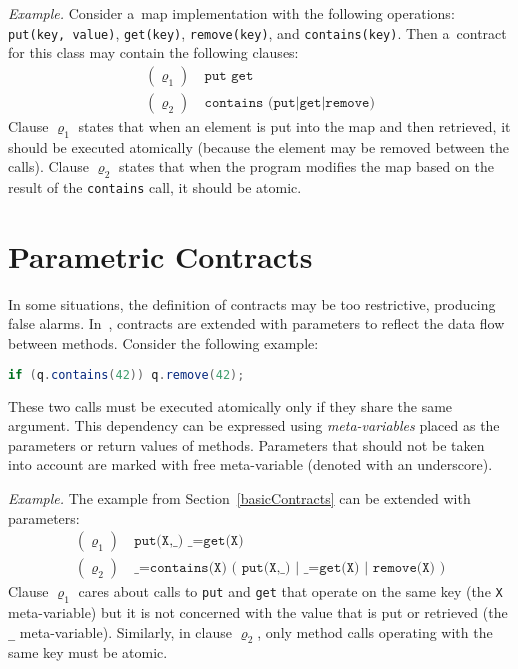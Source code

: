 \medskip \noindent
\emph{Example.} Consider a~map implementation with the following operations:
\texttt{put(key, value)}, \texttt{get(key)}, \texttt{remove(key)}, and
\texttt{contains(key)}. Then a~contract for this class may contain the following
clauses:
\begin{align*}
    (\varrho_1) &\ \texttt{put get}\\
    (\varrho_2) &\ \texttt{contains (put|get|remove)}
\end{align*}
Clause $\varrho_1$ states that when an element is put into the map and then
retrieved, it should be executed atomically (because the element may be removed
between the calls). Clause $\varrho_2$ states that when the program modifies the
map based on the result of the \texttt{contains} call, it should be atomic.

\section{Parametric Contracts}
\label{parametricContracts}

In some situations, the definition of contracts may be too restrictive,
producing false alarms. In~\cite{contracts}, contracts are extended with
parameters to reflect the data flow between methods. Consider the following
example:
\begin{lstlisting}[language=java, frame=none]
if (q.contains(42)) q.remove(42);
\end{lstlisting}
These two calls must be executed atomically only if they share the same
argument. This dependency can be expressed using \emph{meta-variables} placed as
the parameters or return values of methods. Parameters that should not be taken
into account are marked with free meta-variable (denoted with an underscore).

\medskip \noindent \emph{Example.} The example from Section~\ref{basicContracts}
can be extended with parameters:
\begin{align*}
    (\varrho_1) &\ \texttt{put(X,\_) \_=get(X)}\\
    (\varrho_2) &\ \texttt{\_=contains(X) ( put(X,\_) | \_=get(X) |
    remove(X) )}
\end{align*}
Clause $\varrho_1$ cares about calls to \texttt{put} and \texttt{get} that
operate on the same key (the \texttt{X} meta-variable) but it is not concerned
with the value that is put or retrieved (the \texttt{\_} meta-variable).
Similarly, in clause $\varrho_2$, only method calls operating with the same key
must be atomic.

